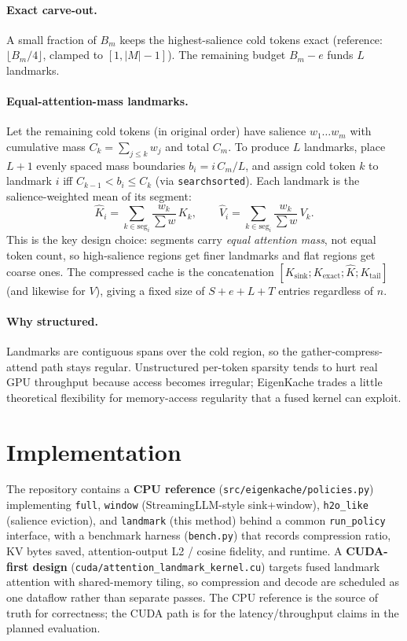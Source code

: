 \documentclass[10pt,twocolumn]{article}
\newcommand{\code}[1]{\texttt{#1}}
\begin{document}
\paragraph{Exact carve-out.} A small fraction of $B_m$ keeps the
highest-salience cold tokens exact (reference: $\lfloor B_m/4 \rfloor$, clamped
to $[1, |M|{-}1]$). The remaining budget $B_m - e$ funds $L$ landmarks.

\paragraph{Equal-attention-mass landmarks.} Let the remaining cold tokens (in
original order) have salience $w_1\ldots w_m$ with cumulative mass
$C_k = \sum_{j \le k} w_j$ and total $C_m$. To produce $L$ landmarks, place
$L{+}1$ evenly spaced mass boundaries $b_i = i\,C_m/L$, and assign cold token $k$
to landmark $i$ iff $C_{k-1} < b_i \le C_k$ (via \code{searchsorted}). Each
landmark is the salience-weighted mean of its segment:
\begin{equation}
\hat{K}_i = \!\!\sum_{k \in \mathrm{seg}_i}\!\! \frac{w_k}{\sum w}\, K_k,
\qquad
\hat{V}_i = \!\!\sum_{k \in \mathrm{seg}_i}\!\! \frac{w_k}{\sum w}\, V_k.
\end{equation}
This is the key design choice: segments carry \emph{equal attention mass}, not
equal token count, so high-salience regions get finer landmarks and flat regions
get coarse ones. The compressed cache is the concatenation
$[K_{\text{sink}}; K_{\text{exact}}; \hat{K}; K_{\text{tail}}]$ (and likewise for
$V$), giving a fixed size of $S + e + L + T$ entries regardless of $n$.

\paragraph{Why structured.} Landmarks are contiguous spans over the cold region,
so the gather-compress-attend path stays regular. Unstructured per-token
sparsity tends to hurt real GPU throughput because access becomes irregular;
EigenKache trades a little theoretical flexibility for memory-access regularity
that a fused kernel can exploit.

\section{Implementation}
The repository contains a \textbf{CPU reference}
(\code{src/eigenkache/policies.py}) implementing \code{full}, \code{window}
(StreamingLLM-style sink+window), \code{h2o\_like} (salience eviction), and
\code{landmark} (this method) behind a common \code{run\_policy} interface, with
a benchmark harness (\code{bench.py}) that records compression ratio, KV bytes
saved, attention-output L2 / cosine fidelity, and runtime. A \textbf{CUDA-first
design} (\code{cuda/attention\_landmark\_kernel.cu}) targets fused landmark
attention with shared-memory tiling, so compression and decode are scheduled as
one dataflow rather than separate passes. The CPU reference is the source of
truth for correctness; the CUDA path is for the latency/throughput claims in the
planned evaluation.
\end{document}
